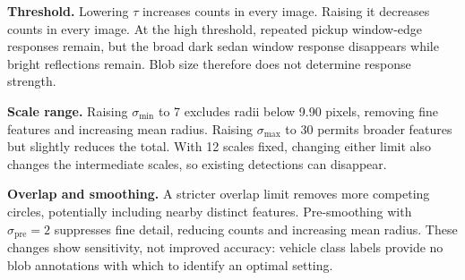\textbf{Threshold.} Lowering $\tau$ increases counts in every image. Raising
it decreases counts in every image. At the high threshold, repeated pickup
window-edge responses remain, but the broad dark sedan window response
disappears while bright reflections remain. Blob size therefore does not determine response strength.

\textbf{Scale range.} Raising $\sigma_{\min}$ to 7 excludes radii below
9.90 pixels, removing fine features and increasing mean radius. Raising
$\sigma_{\max}$ to 30 permits broader features but slightly reduces the total.
With 12 scales fixed, changing either limit also changes the intermediate
scales, so existing detections can disappear.

\textbf{Overlap and smoothing.} A stricter overlap limit removes more
competing circles, potentially including nearby distinct features.
Pre-smoothing with $\sigma_{\mathrm{pre}}=2$ suppresses fine detail, reducing
counts and increasing mean radius. These changes show sensitivity, not
improved accuracy: vehicle class labels provide no blob annotations with
which to identify an optimal setting.
\FloatBarrier
